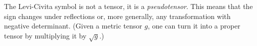     \begin{remark}[Pseudotensor]\label{vector:levi_civita_pseudotensor}
        The Levi-Civita symbol is not a tensor, it is a \textit{pseudotensor}. This means that the sign changes under reflections or, more generally, any transformation with negative determinant. (Given a metric tensor $g$, one can turn it into a proper tensor by multiplying it by $\sqrt{g}$.)
    \end{remark}

